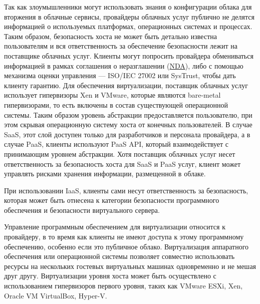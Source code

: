 Так как злоумышленники могут использовать знания о конфигурации облака для вторжения в облачные сервисы, провайдеры облачных услуг публично не делятся информацией о используемых платформах, операционных системах и процессах.
Таким образом, безопасность хоста не может быть детально известна пользователям и вся ответственность за обеспечение безопасности лежит на поставщике облачных услуг.
Клиенты могут попросить провайдера обмениваться информацией в рамках соглашения о неразглашении (\hyperlink{nda}{NDA}), либо с помощью механизма оценки управления --- ISO/IEC 27002 или SysTrust, чтобы дать клиенту гарантию.
Для обеспечения виртуализации, поставщик облачных услуг использует гипервизоры Xen и VMware, которые являются bare-metal гипервизорами, то есть включены в состав существующей операционной системы.
Таким образом уровень абстракции предоставляется пользователю, при этом скрывая операционную систему хоста от конечных пользователей.
В случае SaaS, этот слой доступен только для разработчиков и персонала провайдера, а в случае PaaS, клиенты используют PaaS API, который взаимодействует с принимающим уровнем абстракции.
Хотя поставщик облачных услуг несет ответственность за безопасность хоста для SaaS и PaaS услуг, клиент может управлять рисками хранения информации, размещенной в облаке.

При использовании IaaS, клиенты сами несут ответственность за безопасность, которая может быть отнесена к категории безопасности программного обеспечения и безопасности виртуального сервера.

Управление программным обеспечением для виртуализации относится к провайдеру, в то время как клиенты не имеют доступа к этому программному обеспечению, особенно если это публичное облако.
Виртуализация аппаратного обеспечения или операционной системы позволяет совместно использовать ресурсы на нескольких гостевых виртуальных машинах одновременно и не мешая друг другу.
Виртуализации уровня хоста может быть осуществлено с использованием гипервизоров первого уровня, таких как VMware ESXi, Xen, Oracle VM VirtualBox, Hyper-V.

